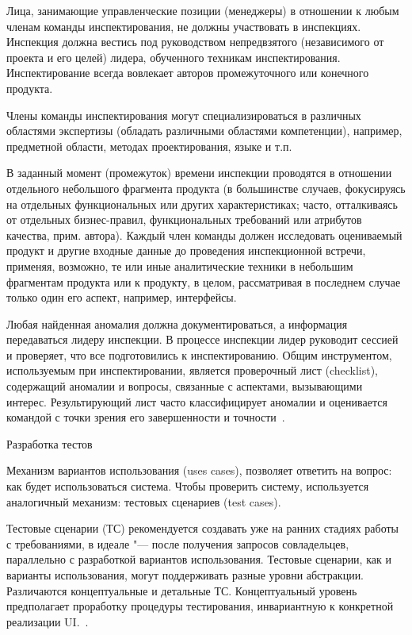 \documentclass{../industrial-development}
\begin{document}
{Лица, занимающие управленческие позиции (менеджеры) в отношении к любым членам команды инспектирования, не должны участвовать в инспекциях. Инспекция должна вестись под руководством непредвзятого (независимого от проекта и его целей) лидера, обученного техникам инспектирования. Инспектирование всегда вовлекает авторов промежуточного или конечного продукта.

Члены команды инспектирования могут специализироваться в различных областями экспертизы (обладать различными областями компетенции), например, предметной области, методах проектирования, языке и т.п. 

В заданный момент (промежуток) времени инспекции проводятся в отношении отдельного небольшого фрагмента продукта (в большинстве случаев, фокусируясь на отдельных функциональных или других характеристиках; часто, отталкиваясь от отдельных бизнес-правил,
функциональных требований или атрибутов качества, прим. автора). Каждый член команды должен исследовать оцениваемый продукт и другие входные данные до проведения инспекционной встречи, применяя, возможно, те или иные аналитические техники в небольшим фрагментам продукта или к продукту, в целом, рассматривая в последнем случае только один его аспект, например, интерфейсы.

Любая найденная аномалия должна документироваться, а информация передаваться лидеру инспекции. В процессе инспекции лидер руководит сессией и проверяет, что все подготовились к инспектированию. Общим инструментом, используемым при инспектировании, является проверочный лист (checklist), содержащий аномалии и вопросы, связанные с аспектами, вызывающими интерес. Результирующий лист часто классифицирует аномалии и оценивается командой с точки зрения его завершенности и точности~\cite[с.~67]{Maglinec}.

\alert{Разработка тестов}

Механизм вариантов использования (uses cases), позволяет ответить на вопрос: как будет использоваться система. Чтобы проверить
систему, используется аналогичный механизм: тестовых сценариев (test cases).

Тестовые сценарии (ТС) рекомендуется создавать уже на ранних стадиях работы с требованиями, в идеале "--- после получения запросов совладельцев, параллельно с разработкой вариантов использования. Тестовые сценарии, как и варианты использования, могут поддерживать разные уровни абстракции. Различаются концептуальные и детальные ТС. Концептуальный уровень предполагает проработку процедуры тестирования, инвариантную к конкретной реализации UI.~\cite[с.~67--68]{Maglinec}.


}
\end{document}
